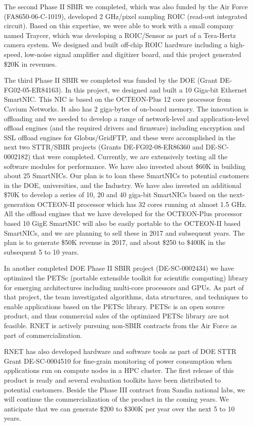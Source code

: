 The second Phase II SBIR we completed, which was also funded by the
Air Force (FA8650-06-C-1019), developed 2 GHz/pixel sampling ROIC
(read-out integrated circuit). Based on this expertise, we were able
to work with a small company named Traycer, which was developing a
ROIC/Sensor as part of a Tera-Hertz camera system. We designed and
built off-chip ROIC hardware including a high-speed, low-noise signal
amplifier and digitizer board, and this project generated \$20K in
revenues. 

The third Phase II SBIR we completed was funded by the DOE (Grant
DE-FG02-05-ER84163). In this project, we designed and built a 10
Giga-bit Ethernet SmartNIC. This NIC is based on the OCTEON-Plus 12
core processor from Cavium Networks. It also has 2 giga-bytes of
on-board memory. The innovation is offloading and we needed to
develop a range of network-level and application-level offload engines
(and the required drivers and firmware) including encryption and SSL
offload engines for Globus/GridFTP, and these were accomplished in the
next two STTR/SBIR projects (Grants DE-FG02-08-ER86360 and
DE-SC-0002182) that were completed. Currently, we are extensively
testing all the software modules for performance. We have also
invested about \$60K in building about 25 SmartNICs. Our plan is to
loan these SmartNICs to potential customers in the DOE,
universities, and the Industry. We have also invested an additional
\$70K to develop a series of 10, 20 and 40 giga-bit SmartNICs based on
the next-generation OCTEON-II processor which has 32 cores running at
almost 1.5 GHz. All the offload engines that we have developed for the
OCTEON-Plus processor based 10 GigE SmartNIC will also be easily
portable to the OCTEON-II based SmartNICs, and we are planning to sell
these in 2017 and subsequent years. The plan is to generate
\$50K revenue in 2017, and about \$250 to \$400K in the subsequent 5 to
10 years.

In another  completed DOE Phase II SBIR project
(DE-SC-0002434) we have optimized the PETSc (portable extensible
toolkit for scientific computing) library for emerging architectures
including multi-core processors and GPUs. As part of that project, the
team investigated algorithms, data structures, and techniques to
enable applications based on the PETSc library. PETSc is an open
source product, and thus commercial sales of the optimized PETSc
library are not feasible.  RNET is actively pursuing non-SBIR contracts
from the Air Force as part of commercialization.

RNET has also developed hardware and software tools as part of DOE
STTR Grant DE-SC-0004510 for fine-grain monitoring of power
consumption when applications run on compute nodes in a HPC
cluster. The first release of this product is ready and several evaluation
toolkits have been distributed to potential customers. Beside the Phase III contract from Sandia 
national labs, we will continue the commercialization of the product in the coming years. We
anticipate that we can generate \$200 to \$300K per year over the next  5 to 10 years.


